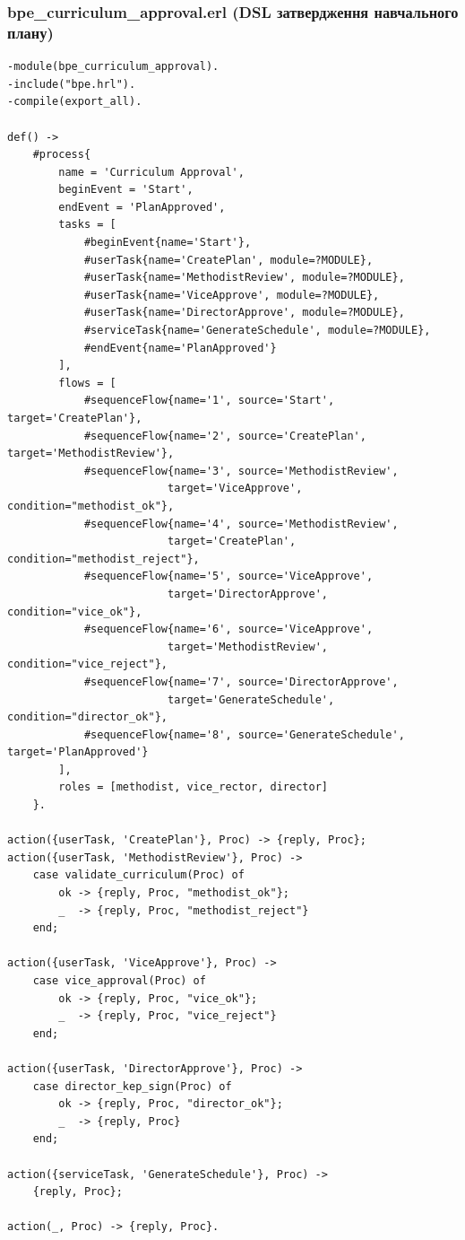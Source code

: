 \documentclass{article}
\begin{document}
\subsubsection{bpe\_curriculum\_approval.erl (DSL затвердження навчального плану)}
\begin{verbatim}
-module(bpe_curriculum_approval).
-include("bpe.hrl").
-compile(export_all).

def() ->
    #process{
        name = 'Curriculum Approval',
        beginEvent = 'Start',
        endEvent = 'PlanApproved',
        tasks = [
            #beginEvent{name='Start'},
            #userTask{name='CreatePlan', module=?MODULE},
            #userTask{name='MethodistReview', module=?MODULE},
            #userTask{name='ViceApprove', module=?MODULE},
            #userTask{name='DirectorApprove', module=?MODULE},
            #serviceTask{name='GenerateSchedule', module=?MODULE},
            #endEvent{name='PlanApproved'}
        ],
        flows = [
            #sequenceFlow{name='1', source='Start', target='CreatePlan'},
            #sequenceFlow{name='2', source='CreatePlan', target='MethodistReview'},
            #sequenceFlow{name='3', source='MethodistReview', 
                         target='ViceApprove', condition="methodist_ok"},
            #sequenceFlow{name='4', source='MethodistReview', 
                         target='CreatePlan', condition="methodist_reject"},
            #sequenceFlow{name='5', source='ViceApprove', 
                         target='DirectorApprove', condition="vice_ok"},
            #sequenceFlow{name='6', source='ViceApprove', 
                         target='MethodistReview', condition="vice_reject"},
            #sequenceFlow{name='7', source='DirectorApprove', 
                         target='GenerateSchedule', condition="director_ok"},
            #sequenceFlow{name='8', source='GenerateSchedule', target='PlanApproved'}
        ],
        roles = [methodist, vice_rector, director]
    }.

action({userTask, 'CreatePlan'}, Proc) -> {reply, Proc};
action({userTask, 'MethodistReview'}, Proc) ->
    case validate_curriculum(Proc) of
        ok -> {reply, Proc, "methodist_ok"};
        _  -> {reply, Proc, "methodist_reject"}
    end;

action({userTask, 'ViceApprove'}, Proc) ->
    case vice_approval(Proc) of
        ok -> {reply, Proc, "vice_ok"};
        _  -> {reply, Proc, "vice_reject"}
    end;

action({userTask, 'DirectorApprove'}, Proc) ->
    case director_kep_sign(Proc) of
        ok -> {reply, Proc, "director_ok"};
        _  -> {reply, Proc}
    end;

action({serviceTask, 'GenerateSchedule'}, Proc) ->
    {reply, Proc};

action(_, Proc) -> {reply, Proc}.
\end{verbatim}
\end{document}
